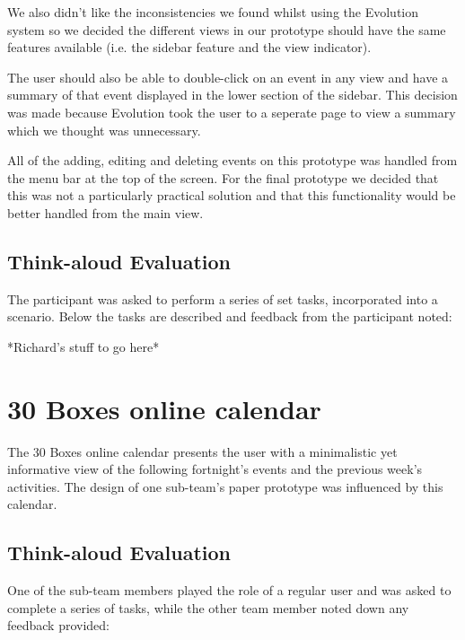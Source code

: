 \documentclass{article}
\begin{document}
We also didn't like the inconsistencies we found whilst using the
Evolution system so we decided the different views in our prototype
should have the same features available (i.e. the sidebar feature and
the view indicator).

The user should also be able to double-click on an event in any view and
have a summary of that event displayed in the lower section of the
sidebar. This decision was made because Evolution took the user to a
seperate page to view a summary which we thought was unnecessary.

All of the adding, editing and deleting events on this prototype was 
handled from the menu bar at the top of the screen. For the final
prototype we decided that this was not a particularly practical solution
and that this functionality would be better handled from the main view.

\subsection{Think-aloud Evaluation}
The participant was asked to perform a series of set tasks, incorporated
into a scenario. Below the tasks are described and feedback from the
participant noted:

*Richard's stuff to go here*

\section{30 Boxes online calendar}

The 30 Boxes online calendar presents the user with a minimalistic yet 
informative view of the following fortnight's events and the previous 
week's activities. The design of one sub-team's paper prototype was influenced 
by this calendar. 

\subsection{Think-aloud Evaluation}

One of the sub-team members played the role of a regular user and was asked to 
complete a series of tasks, while the other team member noted down any
feedback provided:
\end{document}
